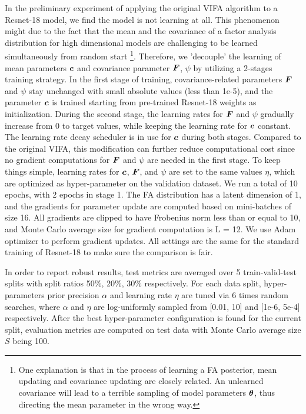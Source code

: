 \documentclass[10pt]{article} %
\begin{document}
In the preliminary experiment of applying the original VIFA algorithm to a Resnet-18 model, we find the model is not learning at all. This phenomenon might due to the fact that the mean and the covariance of a factor analysis distribution for high dimensional models are challenging to be learned simultaneously from random start \footnote{One explanation is that in the process of learning a FA posterior, mean updating and covariance updating are closely related. An unlearned covariance will lead to a terrible sampling of model parameters ${\bm{\theta}}$, thus directing the mean parameter in the wrong way.}. Therefore, we 'decouple' the learning of mean parameters ${\bm{c}}$ and covariance parameter ${\bm{F}}$, $\psi$ by utilizing a 2-stages training strategy. In the first stage of training, covariance-related parameters ${\bm{F}}$ and $\psi$ stay unchanged with small absolute values (less than 1e-5), and the parameter ${\bm{c}}$ is trained starting from pre-trained Resnet-18 weights as initialization. During the second stage, the learning rates for ${\bm{F}}$ and $\psi$ gradually increase from 0 to target values, while keeping the learning rate for ${\bm{c}}$ constant. The learning rate decay scheduler is in use for ${\bm{c}}$ during both stages. Compared to the original VIFA, this modification can further reduce computational cost since no gradient computations for ${\bm{F}}$ and $\psi$ are needed in the first stage. To keep things simple, learning rates for ${\bm{c}}$, ${\bm{F}}$, and $\psi$ are set to the same values $\eta$, which are optimized as hyper-parameter on the validation dataset. We run a total of 10 epochs, with 2 epochs in stage 1. The FA distribution has a latent dimension of 1, and the gradients for parameter update are computed based on mini-batches of size 16. All gradients are clipped to have Frobenius norm less than or equal to 10, and Monte Carlo average size for gradient computation is L = 12. We use Adam optimizer \citep{kingma2014adam} to perform gradient updates.
All settings are the same for the standard training of Resnet-18 to make sure the comparison is fair.

In order to report robust results, test metrics are averaged over 5 train-valid-test splits with split ratios  50\%, 20\%, 30\% respectively. For each data split, hyper-parameters prior precision $\alpha$ and learning rate $\eta$ are tuned via 6 times random searches, where $\alpha$ and $\eta$ are log-uniformly sampled from [0.01, 10] and [1e-6, 5e-4] respectively. After the best hyper-parameter configuration is found for the current split, evaluation metrics are computed on test data with Monte Carlo average size $S$ being 100.
\end{document}
